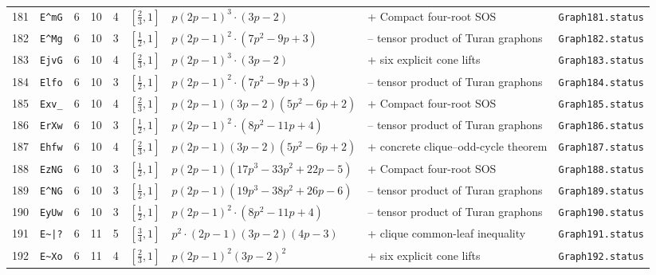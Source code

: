 \begin{landscape}
\begin{longtable}{r l r r r l p{4.0cm} p{3.5cm} p{2.7cm}}
181 & \texttt{E\textasciicircum{}mG} & 6 & 10 & 4 & $[\frac{2}{3},1]$ & $p \left(2 p - 1\right)^{3} \cdot \left(3 p - 2\right)$ & + Compact four-root SOS & \texttt{Graph181.status}\\
182 & \texttt{E\textasciicircum{}Mg} & 6 & 10 & 3 & $[\frac{1}{2},1]$ & $p \left(2 p - 1\right)^{2} \cdot \left(7 p^{2} - 9 p + 3\right)$ & -- tensor product of Turan graphons & \texttt{Graph182.status}\\
183 & \texttt{EjvG} & 6 & 10 & 4 & $[\frac{2}{3},1]$ & $p \left(2 p - 1\right)^{3} \cdot \left(3 p - 2\right)$ & + six explicit cone lifts & \texttt{Graph183.status}\\
184 & \texttt{Elfo} & 6 & 10 & 3 & $[\frac{1}{2},1]$ & $p \left(2 p - 1\right)^{2} \cdot \left(7 p^{2} - 9 p + 3\right)$ & -- tensor product of Turan graphons & \texttt{Graph184.status}\\
185 & \texttt{Exv\_} & 6 & 10 & 4 & $[\frac{2}{3},1]$ & $p \left(2 p - 1\right) \left(3 p - 2\right) \left(5 p^{2} - 6 p + 2\right)$ & + Compact four-root SOS & \texttt{Graph185.status}\\
186 & \texttt{ErXw} & 6 & 10 & 3 & $[\frac{1}{2},1]$ & $p \left(2 p - 1\right)^{2} \cdot \left(8 p^{2} - 11 p + 4\right)$ & -- tensor product of Turan graphons & \texttt{Graph186.status}\\
187 & \texttt{Ehfw} & 6 & 10 & 4 & $[\frac{2}{3},1]$ & $p \left(2 p - 1\right) \left(3 p - 2\right) \left(5 p^{2} - 6 p + 2\right)$ & + concrete clique--odd-cycle theorem & \texttt{Graph187.status}\\
188 & \texttt{EzNG} & 6 & 10 & 3 & $[\frac{1}{2},1]$ & $p \left(2 p - 1\right) \left(17 p^{3} - 33 p^{2} + 22 p - 5\right)$ & + Compact four-root SOS & \texttt{Graph188.status}\\
189 & \texttt{E\textasciicircum{}NG} & 6 & 10 & 3 & $[\frac{1}{2},1]$ & $p \left(2 p - 1\right) \left(19 p^{3} - 38 p^{2} + 26 p - 6\right)$ & -- tensor product of Turan graphons & \texttt{Graph189.status}\\
190 & \texttt{EyUw} & 6 & 10 & 3 & $[\frac{1}{2},1]$ & $p \left(2 p - 1\right)^{2} \cdot \left(8 p^{2} - 11 p + 4\right)$ & -- tensor product of Turan graphons & \texttt{Graph190.status}\\
191 & \texttt{E\textasciitilde{}|?} & 6 & 11 & 5 & $[\frac{3}{4},1]$ & $p^{2} \cdot \left(2 p - 1\right) \left(3 p - 2\right) \left(4 p - 3\right)$ & + clique common-leaf inequality & \texttt{Graph191.status}\\
192 & \texttt{E\textasciitilde{}Xo} & 6 & 11 & 4 & $[\frac{2}{3},1]$ & $p \left(2 p - 1\right)^{2} \left(3 p - 2\right)^{2}$ & + six explicit cone lifts & \texttt{Graph192.status}\\

\end{longtable}
\end{landscape}

